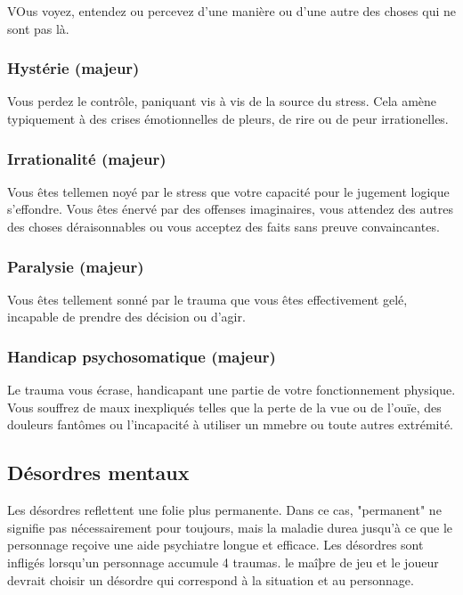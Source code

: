 VOus voyez, entendez ou percevez d'une manière ou d'une autre des choses qui ne sont pas là. 

\subsubsection{Hystérie (majeur)} 

Vous perdez le contrôle, paniquant vis à vis de la source du stress. Cela amène typiquement à des crises émotionnelles de pleurs, de rire ou de peur irrationelles. 

\subsubsection{Irrationalité (majeur)} 

Vous êtes tellemen noyé par le stress que votre capacité pour le jugement logique s'effondre. Vous êtes énervé par des offenses imaginaires, vous attendez des autres des choses déraisonnables ou vous acceptez des faits sans preuve convaincantes. 

\subsubsection{Paralysie (majeur)} 

Vous êtes tellement sonné par le trauma que vous êtes effectivement gelé, incapable de prendre des décision ou d'agir. 

\subsubsection{Handicap psychosomatique (majeur)} 

Le trauma vous écrase, handicapant une partie de votre fonctionnement physique. Vous souffrez de maux inexpliqués telles que la perte de la vue ou de l'ouïe, des douleurs fantômes ou l'incapacité à utiliser un mmebre ou toute autres extrémité. 

\subsection{Désordres mentaux} \label{sec:disorders} 

Les désordres reflettent une folie plus permanente. Dans ce cas, "permanent" ne signifie pas nécessairement pour toujours, mais la maladie durea jusqu'à ce que le personnage reçoive une aide psychiatre longue et efficace. Les désordres sont infligés lorsqu'un personnage accumule 4 traumas. le maîþre de jeu et le joueur devrait choisir un désordre qui correspond à la situation et au personnage. 

